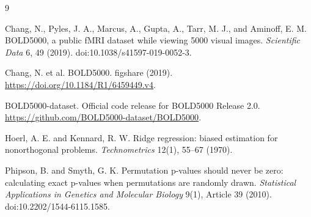 \documentclass[11pt]{article}
\newcommand{\boldfive}{BOLD5000}
\begin{document}
\begin{thebibliography}{9}

Chang, N., Pyles, J. A., Marcus, A., Gupta, A., Tarr, M. J., and Aminoff,
E. M. \boldfive{}, a public fMRI dataset while viewing 5000 visual images.
\emph{Scientific Data} 6, 49 (2019). doi:10.1038/s41597-019-0052-3.

Chang, N. et al. \boldfive{}. figshare (2019).
\url{https://doi.org/10.1184/R1/6459449.v4}.

BOLD5000-dataset. Official code release for \boldfive{} Release 2.0.
\url{https://github.com/BOLD5000-dataset/BOLD5000}.

Hoerl, A. E. and Kennard, R. W. Ridge regression: biased estimation for
nonorthogonal problems. \emph{Technometrics} 12(1), 55--67 (1970).

Phipson, B. and Smyth, G. K. Permutation p-values should never be zero:
calculating exact p-values when permutations are randomly drawn.
\emph{Statistical Applications in Genetics and Molecular Biology} 9(1), Article
39 (2010). doi:10.2202/1544-6115.1585.

\end{thebibliography}
\end{document}
